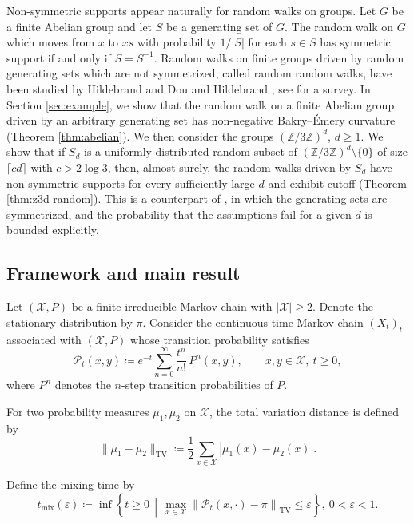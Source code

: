 \documentclass[a4paper, reqno, 11pt]{amsart}
\theoremstyle{definition}
\begin{document}
Non-symmetric supports appear naturally for random walks on groups.
Let $G$ be a finite Abelian group and let $S$ be a generating set of $G$.
The random walk on $G$ which moves from $x$ to $xs$ with probability $1/|S|$ for each $s \in S$ has symmetric support if and only if $S = S^{-1}$.
Random walks on finite groups driven by random generating sets which are not symmetrized, called random random walks, have been studied by Hildebrand \cite{Hildebrand1994} and Dou and Hildebrand \cite{DH1996}; see \cite{Hildebrand2005} for a survey.
In Section \ref{sec:example}, we show that the random walk on a finite Abelian group driven by an arbitrary generating set has non-negative Bakry--\'Emery curvature (Theorem \ref{thm:abelian}).
We then consider the groups $(\mathbb{Z}/3\mathbb{Z})^{d}$, $d \ge 1$. 
We show that if $S_{d}$ is a uniformly distributed random subset of $(\mathbb{Z}/3\mathbb{Z})^{d} \setminus \{0\}$ of size $\lceil cd \rceil$ with $c > 2\log 3$,
then, almost surely, the random walks driven by $S_{d}$ have non-symmetric supports for every sufficiently large $d$ and exhibit cutoff (Theorem \ref{thm:z3d-random}).
This is a counterpart of \cite[Corollary 4]{Salez2024}, in which the generating sets are symmetrized, and the probability that the assumptions fail for a given $d$ is bounded explicitly.

\subsection{Framework and main result}\label{subsec:framework}

Let $(\mathcal{X}, P)$ be a finite irreducible Markov chain with $|\mathcal{X}| \ge 2$. 
Denote the stationary distribution by $\pi$. 
Consider the continuous-time Markov chain $(X_t)_t$ associated with $(\mathcal{X}, P)$ whose transition probability satisfies 
\[\mathscr{P}_t (x,y) \coloneqq  e^{-t} \sum_{n=0}^{\infty} \frac{t^n}{n!} \, P^n (x,y), \qquad x,y \in \mathcal{X},\ t \ge 0, \]
where $P^n$ denotes the $n$-step transition probabilities of $P$.

For two probability measures $\mu_1,\mu_2$ on $\mathcal{X}$, the total variation distance is defined by
\[ \|\mu_1 - \mu_2\|_{\mathrm{TV}} \coloneqq  \frac{1}{2} \sum_{x \in \mathcal{X}} |\mu_1(x) - \mu_2(x)|. \] 

Define the mixing time by 
\[ t_{\mathrm{mix}}(\varepsilon) \coloneqq  \inf\left\{t\ge 0 \,\middle|\, \max_{x\in\mathcal{X}} \left\|\mathscr{P}_t(x,\cdot)-\pi\right\|_{\mathrm{TV}} \le \varepsilon\right\}, \ 0 < \varepsilon < 1.\]
\end{document}
